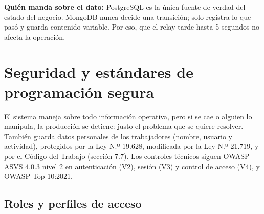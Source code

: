 \documentclass[11pt,a4paper]{article}
\begin{document}
\textbf{Quién manda sobre el dato:} PostgreSQL es la única fuente de verdad del estado del negocio. MongoDB nunca decide una transición; solo registra lo que pasó y guarda contenido variable. Por eso, que el relay tarde hasta 5 segundos no afecta la operación.

\newpage
\section{Seguridad y estándares de programación segura}

El sistema maneja sobre todo información operativa, pero si se cae o alguien lo manipula, la producción se detiene: justo el problema que se quiere resolver. También guarda datos personales de los trabajadores (nombre, usuario y actividad), protegidos por la Ley N.º 19.628, modificada por la Ley N.º 21.719, y por el Código del Trabajo (sección 7.7). Los controles técnicos siguen OWASP ASVS 4.0.3 nivel 2 en autenticación (V2), sesión (V3) y control de acceso (V4), y OWASP Top 10:2021.

\subsection{Roles y perfiles de acceso}
\end{document}
